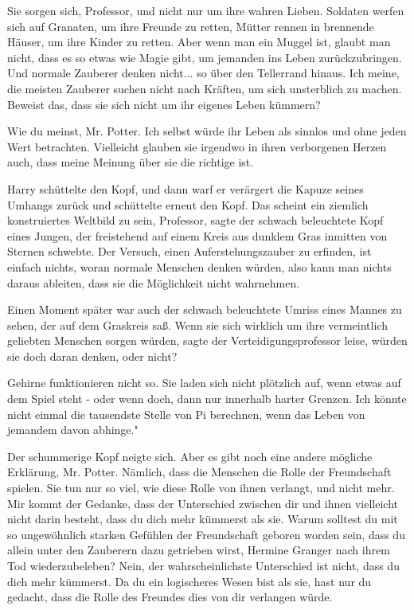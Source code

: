 \glqq Sie sorgen sich, Professor, und nicht nur um ihre wahren Lieben. Soldaten
werfen sich auf Granaten, um ihre Freunde zu retten, Mütter rennen in brennende
Häuser, um ihre Kinder zu retten. Aber wenn man ein Muggel ist, glaubt man
nicht, dass es so etwas wie Magie gibt, um jemanden ins Leben zurückzubringen.
Und normale Zauberer denken nicht... so über den Tellerrand hinaus. Ich meine,
die meisten Zauberer suchen nicht nach Kräften, um sich unsterblich zu machen.
Beweist das, dass sie sich nicht um ihr eigenes Leben kümmern?\grqq{}

\glqq Wie du meinst, Mr. Potter. Ich selbst würde ihr Leben als sinnlos und ohne
jeden Wert betrachten. Vielleicht glauben sie irgendwo in ihren verborgenen
Herzen auch, dass meine Meinung über sie die richtige ist.\grqq{}

Harry schüttelte den Kopf, und dann warf er verärgert die Kapuze seines Umhangs
zurück und schüttelte erneut den Kopf. \glqq Das scheint ein ziemlich
konstruiertes Weltbild zu sein, Professor\grqq{}, sagte der schwach beleuchtete
Kopf eines Jungen, der freistehend auf einem Kreis aus dunklem Gras inmitten von
Sternen schwebte. \glqq Der Versuch, einen Auferstehungszauber zu erfinden, ist
einfach nichts, woran normale Menschen denken würden, also kann man nichts
daraus ableiten, dass sie die Möglichkeit nicht wahrnehmen.\grqq{}

Einen Moment später war auch der schwach beleuchtete Umriss eines Mannes zu
sehen, der auf dem Graskreis saß. \glqq Wenn sie sich wirklich um ihre
vermeintlich geliebten Menschen sorgen würden\grqq{}, sagte der
Verteidigungsprofessor leise, \glqq würden sie doch daran denken, oder
nicht?\grqq{}

\glqq Gehirne funktionieren nicht so. Sie laden sich nicht plötzlich auf, wenn
etwas auf dem Spiel steht - oder wenn doch, dann nur innerhalb harter Grenzen.
Ich könnte nicht einmal die tausendste Stelle von Pi berechnen, wenn das Leben
von jemandem davon abhinge."

Der schummerige Kopf neigte sich. \glqq Aber es gibt noch eine andere mögliche
Erklärung, Mr. Potter. Nämlich, dass die Menschen die Rolle der Freundschaft
spielen. Sie tun nur so viel, wie diese Rolle von ihnen verlangt, und nicht
mehr. Mir kommt der Gedanke, dass der Unterschied zwischen dir und ihnen
vielleicht nicht darin besteht, dass du dich mehr kümmerst als sie. Warum
solltest du mit so ungewöhnlich starken Gefühlen der Freundschaft geboren worden
sein, dass du allein unter den Zauberern dazu getrieben wirst, Hermine Granger
nach ihrem Tod wiederzubeleben? Nein, der wahrscheinlichste Unterschied ist
nicht, dass du dich mehr kümmerst. Da du ein logischeres Wesen bist als sie,
hast nur du gedacht, dass die Rolle des Freundes dies von dir verlangen
würde.\grqq{}

